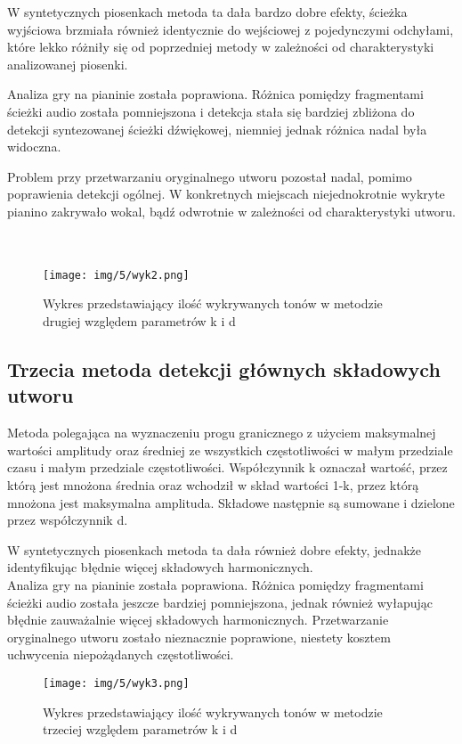 W syntetycznych piosenkach metoda ta dała bardzo dobre efekty, ścieżka wyjściowa brzmiała również identycznie do wejściowej z pojedynczymi odchyłami, które lekko różniły się od poprzedniej metody w zależności od charakterystyki analizowanej piosenki.

Analiza gry na pianinie została poprawiona. Różnica pomiędzy fragmentami ścieżki audio została pomniejszona i detekcja stała się bardziej zbliżona do detekcji syntezowanej ścieżki dźwiękowej, niemniej jednak różnica nadal była widoczna.

Problem przy przetwarzaniu oryginalnego utworu pozostał nadal, pomimo poprawienia detekcji ogólnej. W konkretnych miejscach niejednokrotnie wykryte pianino zakrywało wokal, bądź odwrotnie w zależności od charakterystyki utworu.\\\\\\

\begin{figure}[h]
  \centering
  \texttt{[image: img/5/wyk2.png]}
  \caption{Wykres przedstawiający ilość wykrywanych tonów w metodzie drugiej względem parametrów k i d}
\end{figure}

\subsection{Trzecia metoda detekcji głównych składowych utworu}

Metoda polegająca na wyznaczeniu progu granicznego z użyciem maksymalnej wartości amplitudy oraz średniej ze wszystkich częstotliwości w małym przedziale czasu i małym przedziale częstotliwości. Współczynnik k oznaczał wartość, przez którą jest mnożona średnia oraz wchodził w skład wartości 1-k, przez którą mnożona jest maksymalna amplituda. Składowe następnie są sumowane i dzielone przez współczynnik d.

W syntetycznych piosenkach metoda ta dała również dobre efekty, jednakże identyfikując błędnie więcej składowych harmonicznych.\\

Analiza gry na pianinie została poprawiona. Różnica pomiędzy fragmentami ścieżki audio została jeszcze bardziej pomniejszona, jednak również wyłapując błędnie zauważalnie więcej składowych harmonicznych. Przetwarzanie oryginalnego utworu zostało nieznacznie poprawione, niestety kosztem uchwycenia niepożądanych częstotliwości.

\begin{figure}[h]
  \centering
  \texttt{[image: img/5/wyk3.png]}
  \caption{Wykres przedstawiający ilość wykrywanych tonów w metodzie trzeciej względem parametrów k i d}
\end{figure}

